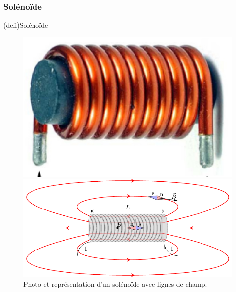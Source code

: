 \documentclass[../../main/main.tex]{subfiles}
\begin{document}
\subsubsection{Solénoïde}
\label{sssec:solen}
\begin{tcb*}(defi){Solénoïde}
	\begin{center}
	\end{center}
\end{tcb*}

\begin{figure}[h]
	\noindent
	\begin{minipage}[c]{.20\linewidth}
	\includegraphics[scale=1]{sol_phot.jpg}
	\end{minipage}
  \hfill
	\begin{minipage}[c]{.70\linewidth}
	\includegraphics[width=\linewidth]{sol_chp}
	\end{minipage}
	\caption{Photo et représentation d'un solénoïde avec lignes de champ.}
	\label{fig:sol1}
\end{figure}
\end{document}
